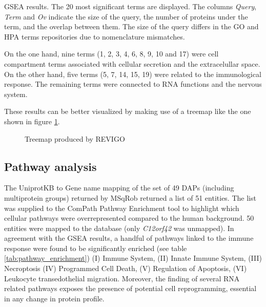\begin{table}[!h]
\caption{\ac{GSEA} results. The 20 most significant terms are displayed. The columns \textit{Query}, \textit{Term} and \textit{Ov} indicate the size of the query, the number of proteins under the term, and the overlap between them. The size of the query differs in the GO and HPA terms repositories due to nomenclature mismatches.}
\label{tab:gsea}
\end{table}
\normalsize

On the one hand, nine terms (1, 2, 3, 4, 6, 8, 9, 10 and 17) were cell compartment terms associated with cellular secretion and the extracelullar space. On the other hand, five terms (5, 7, 14, 15, 19) were related to the immunological response. The remaining terms were connected to RNA functions and the nervous system.

These results can be better visualized by making use of a treemap like the one shown in figure \ref{fig:treemap}.

\begin{figure}
\caption{Treemap produced by REVIGO}
\label{fig:treemap}
\end{figure}

\subsection{Pathway analysis}

The UniprotKB to Gene name mapping of the set of 49 \ac{DAP}s (including multiprotein groups) returned by MSqRob returned a list of 51 entities. The list was supplied to the ComPath Pathway Enrichment tool to highlight which cellular pathways were overrepresented compared to the human background. 50 entities were mapped to the database (only \textit{C12orf42} was unmapped). In agreement with the \ac{GSEA} results, a handful of pathways linked to the immune response were found to be significantly enriched (see table \ref{tab:pathway_enrichment}) (I) Immune System, (II) Innate Immune System, (III) Necroptosis (IV) Programmed Cell Death, (V) Regulation of Apoptosis, (VI) Leukocyte transedothelial migration. Moreover, the finding of several RNA related pathways exposes the presence of potential cell reprogramming, essential in any change in protein profile.

